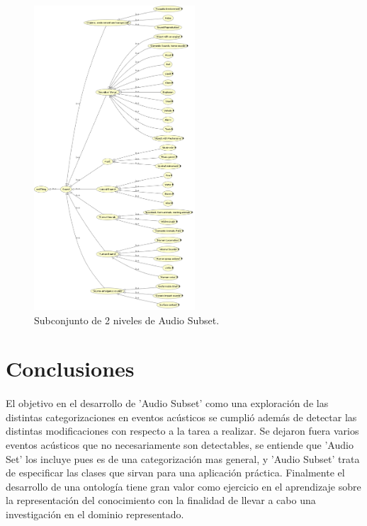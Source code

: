 \documentclass[12pt]{article}
\begin{document}
\paragraph{}
\begin{figure}[h]
	\centering
	\includegraphics[width=0.535\textwidth]{visualization}
	\caption{Subconjunto de 2 niveles de Audio Subset.}
	\label{fig:audioSubset2} 
\end{figure}
\pagebreak
\section{Conclusiones}
\paragraph{}
El objetivo en el desarrollo de 'Audio Subset' como una exploración de las distintas categorizaciones en eventos acústicos se cumplió además de detectar las distintas modificaciones con respecto a la tarea a realizar. Se dejaron fuera varios eventos acústicos que no necesariamente son detectables, se entiende que 'Audio Set' los incluye pues es de una categorización mas general, y 'Audio Subset' trata de especificar las clases que sirvan para una aplicación práctica.
Finalmente el desarrollo de una ontología tiene gran valor como ejercicio en el aprendizaje sobre la representación del conocimiento con la finalidad de llevar a cabo una investigación en el dominio representado.
	
\end{document}
